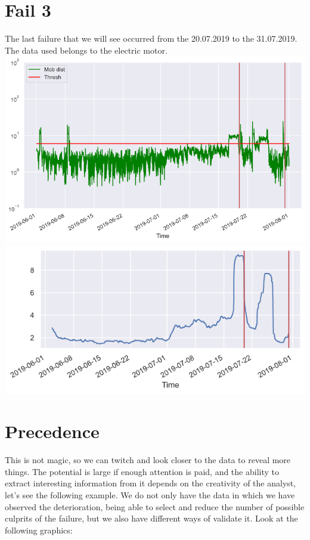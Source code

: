 \documentclass[
]{article}
\begin{document}
\hypertarget{fail-3}{%
\section{Fail 3}\label{fail-3}}

The last failure that we will see occurred from the 20.07.2019 to the
31.07.2019. The data used belongs to the electric motor.\\
\includegraphics{relevant_graphs/8_3_AM.png}
\includegraphics{relevant_graphs/8_3_T.png}

\hypertarget{precedence}{%
\section{Precedence}\label{precedence}}

This is not magic, so we can twitch and look closer to the data to
reveal more things. The potential is large if enough attention is paid,
and the ability to extract interesting information from it depends on
the creativity of the analyst, let's see the following example. We do
not only have the data in which we have observed the deterioration,
being able to select and reduce the number of possible culprits of the
failure, but we also have different ways of validate it. Look at the
following graphics:
\end{document}
